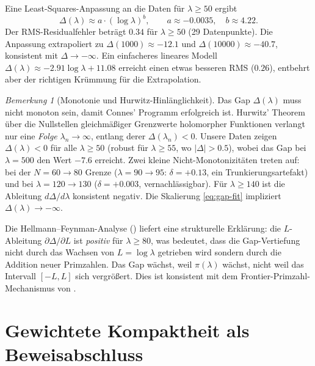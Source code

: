 \documentclass[12pt,a4paper]{article}
\theoremstyle{definition}
\theoremstyle{remark}
\newtheorem{remark}[theorem]{Bemerkung}
\begin{document}
Eine Least-Squares-Anpassung an die Daten für $\lambda \geq 50$ ergibt
\begin{equation}
\label{eq:gap-fit}
\Delta(\lambda) \approx a \cdot (\log\lambda)^b, \qquad a \approx -0.0035,\quad b \approx 4.22.
\end{equation}
Der RMS-Residualfehler beträgt $0.34$ für $\lambda \geq 50$ (29 Datenpunkte). Die Anpassung extrapoliert zu $\Delta(1000) \approx -12.1$ und $\Delta(10000) \approx -40.7$, konsistent mit $\Delta \to -\infty$.
Ein einfacheres lineares Modell $\Delta(\lambda) \approx -2.91 \log\lambda + 11.08$ erreicht einen etwas besseren RMS ($0.26$), entbehrt aber der richtigen Krümmung für die Extrapolation.

\begin{remark}[Monotonie und Hurwitz-Hinlänglichkeit]
\label{rem:hurwitz}
Das Gap $\Delta(\lambda)$ muss nicht monoton sein, damit Connes' Programm erfolgreich ist. Hurwitz' Theorem über die Nullstellen gleichmäßiger Grenzwerte holomorpher Funktionen verlangt nur eine \emph{Folge} $\lambda_n \to \infty$, entlang derer $\Delta(\lambda_n) < 0$. Unsere Daten zeigen $\Delta(\lambda) < 0$ für alle $\lambda \geq 50$ (robust für $\lambda \geq 55$, wo $|\Delta| > 0.5$), wobei das Gap bei $\lambda = 500$ den Wert $-7.6$ erreicht. Zwei kleine Nicht-Monotonizitäten treten auf: bei der $N = 60 \to 80$ Grenze ($\lambda = 90 \to 95$: $\delta = +0.13$, ein Trunkierungsartefakt) und bei $\lambda = 120 \to 130$ ($\delta = +0.003$, vernachlässigbar). Für $\lambda \geq 140$ ist die Ableitung $d\Delta/d\lambda$ konsistent negativ. Die Skalierung \eqref{eq:gap-fit} impliziert $\Delta(\lambda) \to -\infty$.

Die Hellmann--Feynman-Analyse () liefert eine strukturelle Erklärung: die $L$-Ableitung $\partial\Delta/\partial L$ ist \emph{positiv} für $\lambda \geq 80$, was bedeutet, dass die Gap-Vertiefung nicht durch das Wachsen von $L = \log\lambda$ getrieben wird sondern durch die Addition neuer Primzahlen. Das Gap wächst, weil $\pi(\lambda)$ wächst, nicht weil das Intervall $[-L, L]$ sich vergrößert. Dies ist konsistent mit dem Frontier-Primzahl-Mechanismus von .
\end{remark}


\section{Gewichtete Kompaktheit als Beweisabschluss}
\label{sec:weighted-compactness}
\end{document}
